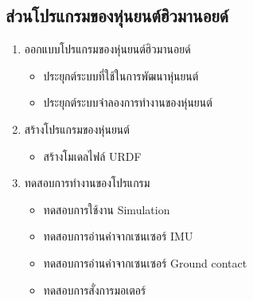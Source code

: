 \subsection{ส่วนโปรแกรมของหุ่นยนต์ฮิวมานอยด์}
\begin{enumerate}[label=\arabic*, leftmargin=1.5cm]
	\item ออกแบบโปรแกรมของหุ่นยนต์ฮิวมานอยด์\vspace{-3mm}
	\begin{itemize}\setlength\itemsep{-0.3em}
		\item ประยุกต์ระบบที่ใช้ในการพัฒนาหุ่นยนต์
		\item ประยุกต์ระบบจำลองการทำงานของหุ่นยนต์
	\end{itemize}
	\item สร้างโปรแกรมของหุ่นยนต์\vspace{-3mm}
	\begin{itemize}\setlength\itemsep{-0.3em}
		\item สร้างโมเดลไฟล์ URDF
	\end{itemize}
	\item ทดสอบการทำงานของโปรแกรม\vspace{-3mm}
	\begin{itemize}\setlength\itemsep{-0.3em}
		\item ทดสอบการใช้งาน Simulation
		\item ทดสอบการอ่านค่าจากเซนเซอร์ IMU
		\item ทดสอบการอ่านค่าจากเซนเซอร์ Ground contact
		\item ทดสอบการสั่งการมอเตอร์
	\end{itemize}
\end{enumerate}

